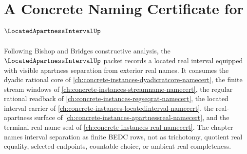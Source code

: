 \chapter{A Concrete Naming Certificate for $\LocatedApartnessIntervalUp$}
\label{ch:concrete-instances-located-apartness-interval-namecert}

Following Bishop and Bridges constructive analysis, the $\LocatedApartnessIntervalUp$ packet records a located real interval equipped with visible apartness separation from exterior real names. It consumes the dyadic rational core of \autoref{ch:concrete-instances-dyadicratcore-namecert}, the finite stream windows of \autoref{ch:concrete-instances-streamname-namecert}, the regular rational readback of \autoref{ch:concrete-instances-regseqrat-namecert}, the located interval carrier of \autoref{ch:concrete-instances-locatedinterval-namecert}, the real-apartness surface of \autoref{ch:concrete-instances-apartnessreal-namecert}, and the terminal real-name seal of \autoref{ch:concrete-instances-real-namecert}. The chapter names interval separation as finite BEDC rows, not as trichotomy, quotient real equality, selected endpoints, countable choice, or ambient real completeness.

